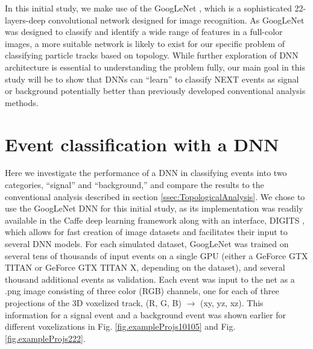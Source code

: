 \documentclass[a4paper,11pt]{article}
\begin{document}
In this initial study, we make use of the GoogLeNet \cite{Googlenet}, which is a sophisticated 22-layers-deep convolutional network designed for image recognition.  As GoogLeNet was
designed to classify and identify a wide range of features in a full-color images, a more suitable network is likely to exist for our specific problem of classifying particle tracks based on
topology.  While further exploration of DNN architecture is essential to understanding the problem fully, our main goal in this study will be to show that DNNs can ``learn'' to classify 
NEXT events as signal or background potentially better than previously developed conventional analysis methods.

\section{Event classification with a DNN}

Here we investigate the performance of a DNN in classifying events into two categories, ``signal'' and ``background,'' and compare the results to the conventional analysis described in
section \ref{ssec:TopologicalAnalysis}.  We chose to use the GoogLeNet DNN for this initial study, as its implementation was readily available in the Caffe \cite{jia2014caffe}
deep learning framework along with an interface, DIGITS \cite{DIGITS}, which allows for fast creation of image datasets and facilitates their input to several DNN models.  For each simulated
dataset, GoogLeNet was trained on several tens of thousands of input events on a single GPU (either a GeForce GTX TITAN or GeForce GTX TITAN X, depending on the dataset), and several
thousand additional events as validation.  Each event was input to the net as a .png image consisting of three
color (RGB) channels, one for each of three projections of the 3D voxelized track, (R, G, B) $\rightarrow$ (xy, yz, xz).  This information for a signal event and a background event was
shown earlier for different voxelizations in Fig. \ref{fig.exampleProjs10105} and Fig. \ref{fig.exampleProjs222}.
\end{document}
